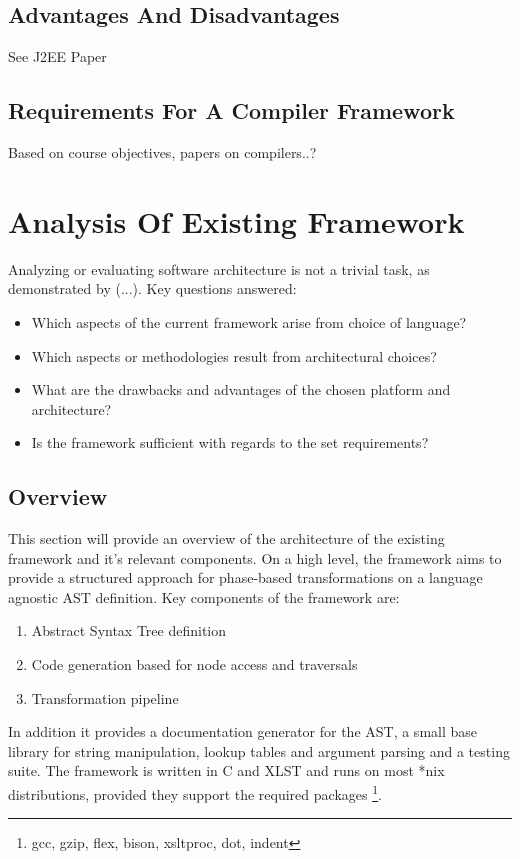 \documentclass[final,a4paper,12pt]{article}
\begin{document}
\subsection{Advantages And Disadvantages}
See J2EE Paper
\subsection{Requirements For A Compiler Framework}
Based on course objectives, papers on compilers..?

\section{Analysis Of Existing Framework}
Analyzing or evaluating software architecture is not a trivial task, as demonstrated by (...). Key questions answered:
\begin{itemize}
	\item Which aspects of the current framework arise from choice of language?
	\item Which aspects or methodologies result from architectural choices?
	\item What are the drawbacks and advantages of the chosen platform and architecture?
	\item Is the framework sufficient with regards to the set requirements?
\end{itemize}

\subsection{Overview}
This section will provide an overview of the architecture of the existing framework and it's relevant components. On a high level, the framework aims to provide a structured approach for phase-based transformations on a language agnostic AST definition. Key components of the framework are:
\begin{enumerate}
	\item Abstract Syntax Tree definition
	\item Code generation based for node access and traversals
	\item Transformation pipeline
\end{enumerate}

In addition it provides a documentation generator for the AST, a small base library for string manipulation, lookup tables and argument parsing and a testing suite. The framework is written in C and XLST and runs on most *nix distributions, provided they support the required packages \footnote{gcc, gzip, flex, bison, xsltproc, dot, indent}.
\end{document}
